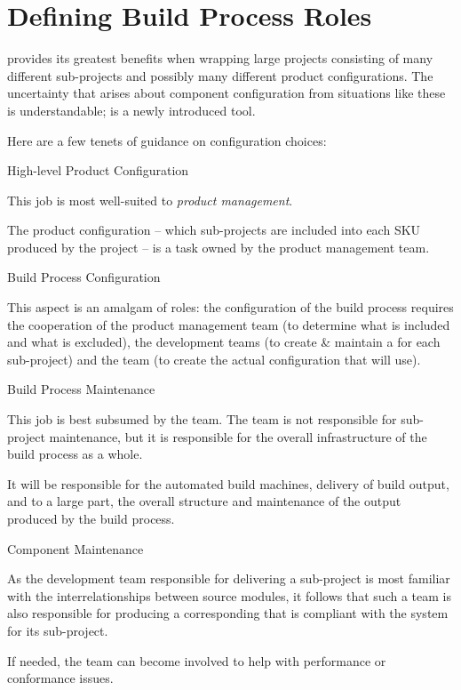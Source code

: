 \section{Defining Build Process Roles}\label{wrap:build-process-roles}

\lmsbw provides its greatest benefits when wrapping large projects
consisting of many different sub-projects and possibly many different
product configurations.  The uncertainty that arises about component
configuration from situations like these is understandable; \lmsbw is
a newly introduced tool.

Here are a few tenets of guidance on configuration choices:

\begin{description}
  \item High-level Product Configuration

    This job is most well-suited to \emph{product management}.

    The product configuration -- which sub-projects are included into
    each SKU produced by the project -- is a task owned by the product
    management team.

  \item Build Process Configuration

    This aspect is an amalgam of roles: the configuration of the build
    process requires the cooperation of the product management team
    (to determine what is included and what is excluded), the
    development teams (to create \& maintain a \makefile for each
    sub-project) and the \bni team (to create the actual configuration
    that \lmsbw will use).

  \item Build Process Maintenance

    This job is best subsumed by the \emph{\bni} team.  The \bni team
    is not responsible for sub-project \makefile maintenance, but it
    is responsible for the overall infrastructure of the build process
    as a whole.

    It will be responsible for the automated build machines, delivery
    of build output, and to a large part, the overall structure and
    maintenance of the output produced by the build process.

  \item Component \makefile Maintenance

    As the development team responsible for delivering a sub-project
    is most familiar with the interrelationships between source
    modules, it follows that such a team is also responsible for
    producing a corresponding \makefile that is compliant with the
    \lmsbw system for its sub-project.

    If needed, the \bni team can become involved to help with
    performance or conformance issues.

\end{description}

